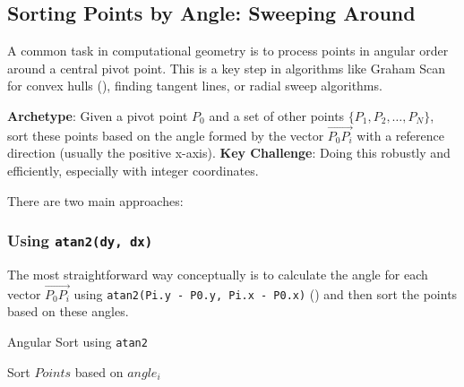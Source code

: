 \subsection{Sorting Points by Angle: Sweeping Around}
\label{ssec:A.4.2}

A common task in computational geometry is to process points in angular order around a central pivot point. This is a key step in algorithms like Graham Scan for convex hulls (), finding tangent lines, or radial sweep algorithms.

\begin{pattern}
\label{pattern:A.4.2.angular_sort}
\textbf{Archetype}: Given a pivot point $P_0$ and a set of other points $\{P_1, P_2, \ldots, P_N\}$, sort these points based on the angle formed by the vector $\vec{P_0P_i}$ with a reference direction (usually the positive x-axis).
\textbf{Key Challenge}: Doing this robustly and efficiently, especially with integer coordinates.
\end{pattern}

There are two main approaches:

\subsubsection{Using \texttt{atan2(dy, dx)}}
\label{sssec:A.4.2.1.atan2_sort}

\begin{intuition}
\label{intuition:A.4.2.atan2_sort}
The most straightforward way conceptually is to calculate the angle for each vector $\vec{P_0P_i}$ using \texttt{atan2(Pi.y - P0.y, Pi.x - P0.x)} () and then sort the points based on these angles.
\end{intuition}

\begin{algorithm}[H]
\caption{Angular Sort using \texttt{atan2}}
Sort $Points$ based on $angle_i$\;
\end{algorithm}

